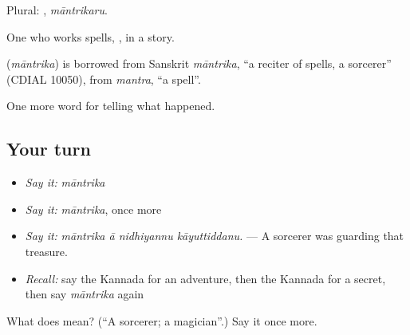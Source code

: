 Plural: , \emph{māntrikaru}.

One who works spells, , in a story.

\begin{cousinweb}
\textbf{} (\emph{māntrika}) is borrowed from Sanskrit \emph{māntrika}, \textquotedblleft{}a reciter of spells, a sorcerer\textquotedblright{} (CDIAL 10050), from \emph{mantra}, \textquotedblleft{}a spell\textquotedblright{}.
\end{cousinweb}

\begin{grammarlens}[title={What you've built}]
One more word for telling what happened.
\end{grammarlens}

\subsection*{Your turn}
\begin{itemize}
\raggedright
  \item \emph{Say it:} \emph{māntrika}
  \item \emph{Say it:} \emph{māntrika}, once more
  \item \emph{Say it:} \emph{māntrika ā nidhiyannu kāyuttiddanu.} — A sorcerer was guarding that treasure.
  \item \emph{Recall:} say the Kannada for an adventure, then the Kannada for a secret, then say \emph{māntrika} again
\end{itemize}

\begin{tcolorbox}[breakable,colback=teal!4,colframe=teal!35!black,title={Before you move on}]
What does  mean? (\textquotedblleft{}A sorcerer; a magician\textquotedblright{}.) Say it once more.
\end{tcolorbox}
